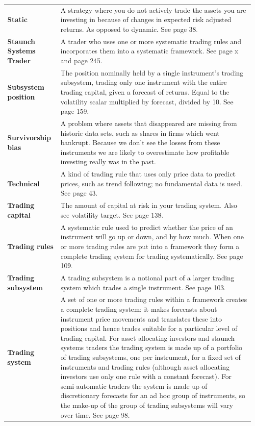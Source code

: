 {\begin{longtable}{@{}>{\raggedright\arraybackslash\bfseries} p{}>{\raggedright\arraybackslash} p{}@{}}
Static & A strategy where you do not actively trade the assets you are investing in because of changes in expected risk adjusted returns. As opposed to dynamic. See page 38. \\[0.65em]
Staunch Systems Trader & A trader who uses one or more systematic trading rules and incorporates them into a systematic framework. See page x and page 245. \\[0.65em]
Subsystem position & The position nominally held by a single instrument’s trading subsystem, trading only one instrument with the entire trading capital, given a forecast of returns. Equal to the volatility scalar multiplied by forecast, divided by 10. See page 159. \\[0.65em]
Survivorship bias & A problem where assets that disappeared are missing from historic data sets, such as shares in firms which went bankrupt. Because we don’t see the losses from these instruments we are likely to overestimate how profitable investing really was in the past. \\[0.65em]
Technical & A kind of trading rule that uses only price data to predict prices, such as trend following; no fundamental data is used. See page 43. \\[0.65em]
Trading capital & The amount of capital at risk in your trading system. Also see volatility target. See page 138. \\[0.65em]
Trading rules & A systematic rule used to predict whether the price of an instrument will go up or down, and by how much. When one or more trading rules are put into a framework they form a complete trading system for trading systematically. See page 109. \\[0.65em]
Trading subsystem & A trading subsystem is a notional part of a larger trading system which trades a single instrument. See page 103. \\[0.65em]
Trading system & A set of one or more trading rules within a framework creates a complete trading system; it makes forecasts about instrument price movements and translates these into positions and hence trades suitable for a particular level of trading capital. For asset allocating investors and staunch systems traders the trading system is made up of a portfolio of trading subsystems, one per instrument, for a fixed set of instruments and trading rules (although asset allocating investors use only one rule with a constant forecast). For semi-automatic traders the system is made up of discretionary forecasts for an ad hoc group of instruments, so the make-up of the group of trading subsystems will vary over time. See page 98. \\[0.65em]

\end{longtable}}
